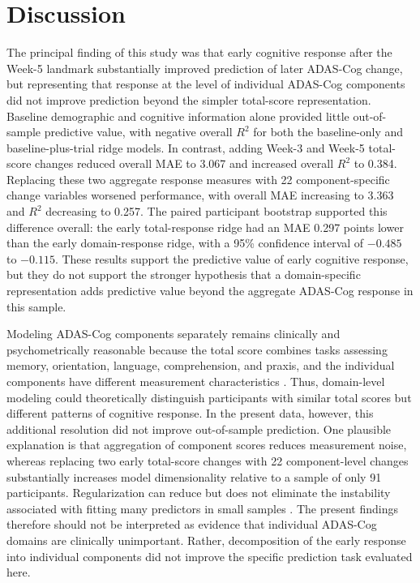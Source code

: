\documentclass[11pt]{article}
\begin{document}
\section{Discussion}

The principal finding of this study was that early cognitive response after the Week-5 landmark substantially improved prediction of later ADAS-Cog change, but representing that response at the level of individual ADAS-Cog components did not improve prediction beyond the simpler total-score representation. Baseline demographic and cognitive information alone provided little out-of-sample predictive value, with negative overall $R^2$ for both the baseline-only and baseline-plus-trial ridge models. In contrast, adding Week-3 and Week-5 total-score changes reduced overall MAE to 3.067 and increased overall $R^2$ to 0.384. Replacing these two aggregate response measures with 22 component-specific change variables worsened performance, with overall MAE increasing to 3.363 and $R^2$ decreasing to 0.257. The paired participant bootstrap supported this difference overall: the early total-response ridge had an MAE 0.297 points lower than the early domain-response ridge, with a 95\% confidence interval of $-0.485$ to $-0.115$. These results support the predictive value of early cognitive response, but they do not support the stronger hypothesis that a domain-specific representation adds predictive value beyond the aggregate ADAS-Cog response in this sample.

Modeling ADAS-Cog components separately remains clinically and psychometrically reasonable because the total score combines tasks assessing memory, orientation, language, comprehension, and praxis, and the individual components have different measurement characteristics \citep{cano2010parts}. Thus, domain-level modeling could theoretically distinguish participants with similar total scores but different patterns of cognitive response. In the present data, however, this additional resolution did not improve out-of-sample prediction. One plausible explanation is that aggregation of component scores reduces measurement noise, whereas replacing two early total-score changes with 22 component-level changes substantially increases model dimensionality relative to a sample of only 91 participants. Regularization can reduce but does not eliminate the instability associated with fitting many predictors in small samples \citep{riley2019continuous}. The present findings therefore should not be interpreted as evidence that individual ADAS-Cog domains are clinically unimportant. Rather, decomposition of the early response into individual components did not improve the specific prediction task evaluated here.
\end{document}
